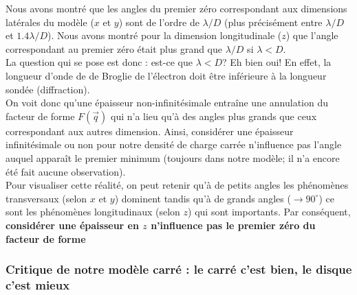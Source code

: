 Nous avons montré que les angles du premier zéro correspondant aux dimensions latérales du modèle ($x$ et $y$) sont de l'ordre de $\lambda / D$ (plus précisément entre $\lambda / D$ et $1.4\lambda / D$). Nous avons montré pour la dimension longitudinale ($z$) que l'angle correspondant au premier zéro était plus grand que $\lambda / D$ si $\lambda < D$.\\
La question qui se pose est donc : est-ce que $\lambda < D$? Eh bien oui! En effet, la longueur d'onde de de Broglie de l'électron doit être inférieure à la longueur sondée (diffraction).\\

On voit donc qu'une épaisseur non-infinitésimale entraîne une annulation du facteur de forme $F(\vec{q})$ qui n'a lieu qu'à des angles plus grands que ceux correspondant aux autres dimension. Ainsi, considérer une épaisseur infinitésimale ou non pour notre densité de charge carrée n'influence pas l'angle auquel apparaît le premier minimum (toujours dans notre modèle; il n'a encore été fait aucune observation). \\

Pour visualiser cette réalité, on peut retenir qu'à de petits angles les phénomènes transversaux (selon $x$ et $y$) dominent tandis qu'à de grands angles ($\rightarrow 90^\circ$) ce sont les phénomènes longitudinaux (selon $z$) qui sont importants. Par conséquent, \textbf{considérer une épaisseur en $z$ n'influence pas le premier zéro du facteur de forme}
    
    
    \subsubsection{Critique de notre modèle carré : le carré c'est bien, le disque c'est mieux}


